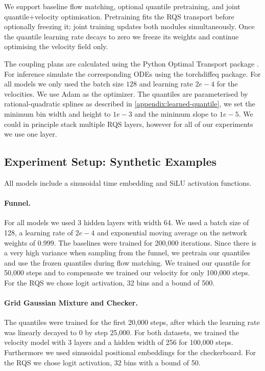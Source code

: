 \documentclass{article}
\theoremstyle{plain}
\theoremstyle{definition}
\theoremstyle{remark}
\begin{document}
We support baseline flow matching, optional quantile pretraining, and joint quantile+velocity optimisation. Pretraining fits the RQS transport before optionally freezing it; joint training updates both modules simultaneously. Once the quantile learning rate decays to zero we freeze its weights and continue optimising the velocity field only. 

The coupling plans are calculated using the Python Optimal Transport package \cite{flamary2021pot}.  For inference simulate the corresponding ODEs using the torchdiffeq \cite{torchdiffeq} package. For all models we only used the batch size $128$ and learning rate $2e-4$ for the velocities. 
 { We use Adam \cite{KB2015} as the optimizer. The quantiles are parameterised by rational-quadratic splines as described in \ref{appendix:learned-quantile}, we set the minimum bin width and height to $1e-3$ and the minimum slope to $1e-5$. We could in principle stack multiple RQS layers, however for all of our experiments we use one layer.}

\subsection{Experiment Setup: Synthetic Examples}
All models include a sinusoidal time embedding and SiLU activation functions. 

\paragraph{Funnel.}
For all models we used 3 hidden layers with width 64. We used a batch size of 128, a learning rate of $2e-4$ and exponential moving average on the network weights of $0.999$. The baselines were trained for 200{,}000 iterations.
{Since there is a very high variance when sampling from the funnel,} we pretrain our quantiles and use the frozen quantiles during flow matching. We trained our quantile for 50{,}000 steps and to compensate we trained our velocity for only 100{,}000 steps. { For the RQS we chose logit activation, 32 bins and a bound of 500.}

\paragraph{Grid Gaussian Mixture and Checker.}
The quantiles were trained for the first 20{,}000 steps, after which the learning rate was linearly decayed to 0 by step 25{,}000. 
For both datasets, we trained the velocity model with 3 layers and a hidden width of 256 for 100{,}000 steps. { Furthermore we used sinusoidal positional embeddings for the checkerboard. For the RQS we chose logit activation, 32 bins with a bound of 50.}
\end{document}
